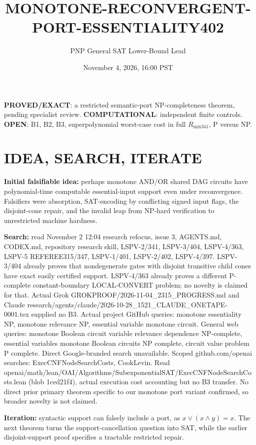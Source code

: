 \documentclass[11pt]{article}
\title{MONOTONE-RECONVERGENT-PORT-ESSENTIALITY402}
\author{PNP General SAT Lower-Bound Lead}
\date{November 4, 2026, 16:00 PST}
\begin{document}
\maketitle
\noindent\textbf{PROVED/EXACT}: a restricted semantic-port NP-completeness theorem, pending specialist review. \textbf{COMPUTATIONAL}: independent finite controls. \textbf{OPEN}: B1, B2, B3, superpolynomial worst-case cost in full $R_{\mathrm{mix341}}$, P versus NP.

\section*{IDEA, SEARCH, ITERATE}
\textbf{Initial falsifiable idea:} perhaps monotone AND/OR shared DAG circuits have polynomial-time computable essential-input support even under reconvergence. Falsifiers were absorption, SAT-encoding by conflicting signed input flags, the disjoint-cone repair, and the invalid leap from NP-hard verification to unrestricted machine hardness.

\textbf{Search:} read November 2 12:04 research refocus, issue 3, AGENTS.md, CODEX.md, repository research skill, LSPV-2/341, LSPV-3/404, LSPV-4/363, LSPV-5 REFEREE315/347, LSPV-1/401, LSPV-2/402, LSPV-4/397. LSPV-3/404 already proves that nondegenerate gates with disjoint transitive child cones have exact easily certified support. LSPV-4/363 already proves a different P-complete constant-boundary LOCAL-CONVERT problem; no novelty is claimed for that. Actual Grok GROKPROOF/2026-11-04_2315_PROGRESS.md and Claude research/agents/claude/2026-10-28_1521_CLAUDE_ONETAPE-0001.tex supplied no B3. Actual project GitHub queries: monotone essentiality NP, monotone relevance NP, essential variable monotone circuit. General web queries: monotone Boolean circuit variable relevance dependence NP-complete, essential variables monotone Boolean circuits NP complete, circuit value problem P complete. Direct Google-branded search unavailable. Scoped github.com/openai searches: ExecCNFNodeSearchCosts, CookLevin. Read openai/math/lean/OAI/Algorithms/SubexponentialSAT/ExecCNFNodeSearchCosts.lean (blob 1ced21f4), actual execution cost accounting but no B3 transfer. No direct prior primary theorem specific to our monotone port variant confirmed, so broader novelty is not claimed.

\textbf{Iteration:} syntactic support can falsely include a port, as $x\lor(x\land y)=x$. The next theorem turns the support-cancellation question into SAT, while the earlier disjoint-support proof specifies a tractable restricted repair.
\end{document}
